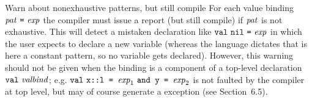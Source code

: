 \begin{clause}{Warn about nonexhaustive patterns, but still compile}
For each value binding $\pat\ \mbox{\ml{=}}\ \exp$ the compiler must
issue a report (but still compile) if $\textit{pat\/}$ is not exhaustive.  This
will detect a mistaken declaration like
$\VAL\ \ml{nil}\ \mbox{\ml{=}}\ \exp$ in which the user expects to
declare a new variable  (whereas the language dictates that
 is here a constant pattern, so no variable gets declared).
However, this warning should not be given when the binding is a
component of a top-level declaration $\mbox{{\tt val}\ \textit{valbind\/}}$; e.g.
$\VAL\ \mbox{\ml{x::l = }}\exp_{1}\ \mbox{\ml{\AND\ y = }}\exp_{2}$ is not
faulted by the compiler at top level, but may of course generate a
 exception (see Section~6.5).
\end{clause}